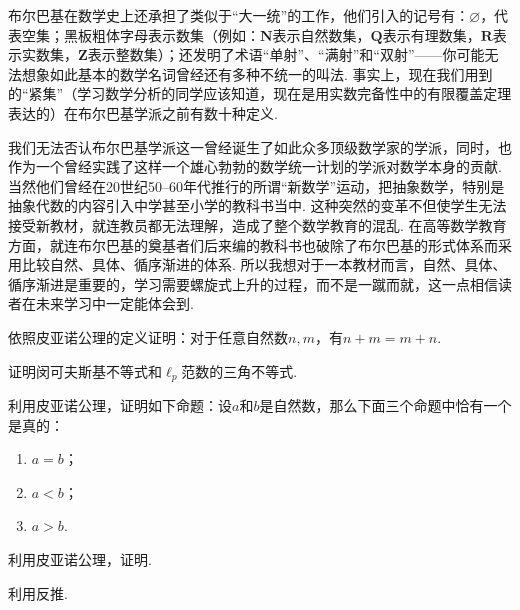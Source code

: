 布尔巴基在数学史上还承担了类似于``大一统''的工作，他们引入的记号有：$\varnothing$，代表空集；黑板粗体字母表示数集（例如：$\mathbf{N}$表示自然数集，$\mathbf{Q}$表示有理数集，$\mathbf{R}$表示实数集，$\mathbf{Z}$表示整数集）；还发明了术语``单射''、``满射''和``双射''——你可能无法想象如此基本的数学名词曾经还有多种不统一的叫法. 事实上，现在我们用到的``紧集''（学习数学分析的同学应该知道，现在是用实数完备性中的有限覆盖定理表达的）在布尔巴基学派之前有数十种定义.

我们无法否认布尔巴基学派这一曾经诞生了如此众多顶级数学家的学派，同时，也作为一个曾经实践了这样一个雄心勃勃的数学统一计划的学派对数学本身的贡献. 当然他们曾经在20世纪50--60年代推行的所谓``新数学''运动，把抽象数学，特别是抽象代数的内容引入中学甚至小学的教科书当中. 这种突然的变革不但使学生无法接受新教材，就连教员都无法理解，造成了整个数学教育的混乱. 在高等数学教育方面，就连布尔巴基的奠基者们后来编的教科书也破除了布尔巴基的形式体系而采用比较自然、具体、循序渐进的体系. 所以我想对于一本教材而言，自然、具体、循序渐进是重要的，学习需要螺旋式上升的过程，而不是一蹴而就，这一点相信读者在未来学习中一定能体会到.

\begin{summary}

\end{summary}

\begin{exercise}

    \begin{exgroup}[2] %
        \item 依照皮亚诺公理的定义证明：对于任意自然数$n,m$，有$n+m=m+n$.
    \end{exgroup}

    \begin{exgroup}
        \item 证明闵可夫斯基不等式和$\ell_p$范数的三角不等式.

        \item 利用皮亚诺公理，证明如下命题：设$a$和$b$是自然数，那么下面三个命题中恰有一个是真的：
        \begin{enumerate}
            \item $a=b$；

            \item $a<b$；

            \item $a>b$.
        \end{enumerate}

        \item 利用皮亚诺公理，证明.

        \item 利用反推.
    \end{exgroup}
\end{exercise}
